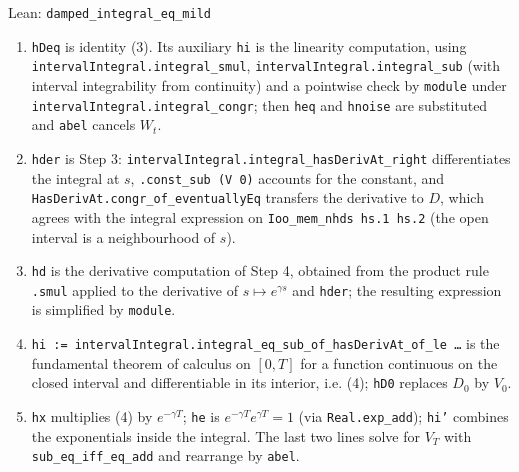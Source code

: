 \documentclass[11pt,a4paper]{article}
\begin{document}
\begin{leanbox}{Lean: \texttt{damped\_\allowbreak{}integral\_\allowbreak{}eq\_\allowbreak{}mild}}
\begin{enumerate}
\item \texttt{h\allowbreak{}Deq} is identity (3). Its auxiliary \texttt{hi} is the linearity computation, using \texttt{interval\allowbreak{}Integral.\allowbreak{}integral\_\allowbreak{}smul}, \texttt{interval\allowbreak{}Integral.\allowbreak{}integral\_\allowbreak{}sub} (with interval integrability from continuity) and a pointwise check by \texttt{module} under \texttt{interval\allowbreak{}Integral.\allowbreak{}integral\_\allowbreak{}congr}; then \texttt{heq} and \texttt{hnoise} are substituted and \texttt{abel} cancels \(W_t\).

\item \texttt{hder} is Step 3: \texttt{interval\allowbreak{}Integral.\allowbreak{}integral\_\allowbreak{}has\allowbreak{}Deriv\allowbreak{}At\_\allowbreak{}right} differentiates the integral at \(s\), \texttt{.\allowbreak{}const\_\allowbreak{}sub (V 0)} accounts for the constant, and \texttt{Has\allowbreak{}Deriv\allowbreak{}At.\allowbreak{}congr\_\allowbreak{}of\_\allowbreak{}eventually\allowbreak{}Eq} transfers the derivative to \(D\), which agrees with the integral expression on \texttt{Ioo\_\allowbreak{}mem\_\allowbreak{}nhds hs.\allowbreak{}1 hs.\allowbreak{}2} (the open interval is a neighbourhood of \(s\)).

\item \texttt{hd} is the derivative computation of Step 4, obtained from the product rule \texttt{.\allowbreak{}smul} applied to the derivative of \(s\mapsto e^{\gamma s}\) and \texttt{hder}; the resulting expression is simplified by \texttt{module}.

\item \texttt{hi := interval\allowbreak{}Integral.\allowbreak{}integral\_\allowbreak{}eq\_\allowbreak{}sub\_\allowbreak{}of\_\allowbreak{}has\allowbreak{}Deriv\allowbreak{}At\_\allowbreak{}of\_\allowbreak{}le …} is the fundamental theorem of calculus on \([0,T]\) for a function continuous on the closed interval and differentiable in its interior, i.e. (4); \texttt{h\allowbreak{}D0} replaces \(D_0\) by \(V_0\).

\item \texttt{hx} multiplies (4) by \(e^{-\gamma T}\); \texttt{he} is \(e^{-\gamma T}e^{\gamma T}=1\) (via \texttt{Real.\allowbreak{}exp\_\allowbreak{}add}); \texttt{hi'} combines the exponentials inside the integral. The last two lines solve for \(V_T\) with \texttt{sub\_\allowbreak{}eq\_\allowbreak{}iff\_\allowbreak{}eq\_\allowbreak{}add} and rearrange by \texttt{abel}.

\end{enumerate}
\end{leanbox}
\end{document}
